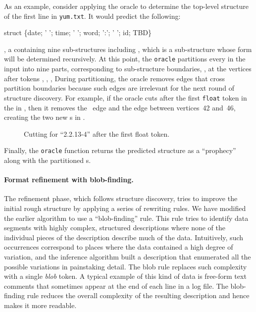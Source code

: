 As an example, consider applying the oracle to determine the top-level
structure of the first line in \texttt{yum.txt}.  It would predict the
following: 
\begin{centercode}
struct \{date;  ' '; time; ' '; word; ':'; ' '; id; TBD\}
\end{centercode}
\ie{}, a  containing nine sub-structures including , which is
a sub-structure whose form will be determined recursively.
At this point, the {\tt oracle} partitions
every \seqset{} in the input into nine parts, corresponding to
sub-structure boundaries,
\ie{}, at the vertices after tokens , , ,
\etc{}
During partitioning, the oracle removes \seqset{} edges that cross partition
boundaries because such edges are irrelevant for the next round
of structure discovery.
For example, if the oracle cuts after the first {\tt float} token in the \seqset{}
in , then it removes the ~edge and the  edge between
vertices~42 and~46, creating the two new \seqset{}s in .
%
\begin{figure}[th]
\begin{center}
\end{center}
\caption{Cutting \seqset{} for ``2.2.13-4'' after the first float token.} \label{fig:cut}
\shrink
\end{figure}
%
Finally, the {\tt oracle} function returns the predicted structure as a ``prophecy''
along with the partitioned \seqset{}s. 

\paragraph*{Format refinement with blob-finding.}
The refinement phase, which follows structure discovery, tries to
improve the initial rough structure by applying a series of
rewriting rules.  We have modified the earlier algorithm to use a 
``blob-finding'' rule.  This rule tries to identify data segments 
with highly complex, structured descriptions where none of the 
individual pieces of the description describe much of the data.
Intuitively, such occurrences correspond to places where the data
contained a high degree of variation, and the inference algorithm
built a description that enumerated all the possible variations in
painstaking detail. 
The blob rule replaces such complexity with a single \textit{blob} token.
A typical example of this kind
of data is free-form text comments that sometimes appear at the end of
each line in a log file.  The blob-finding rule reduces the overall
complexity of the resulting description and hence makes it more
readable.

